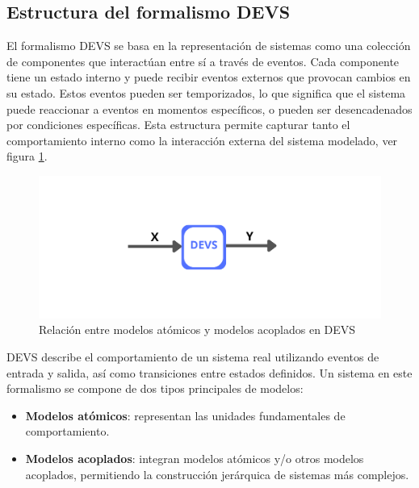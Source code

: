 \documentclass[12pt,oneside]{templates/unerthesis}
\providecommand{\tightlist}{%
  \setlength{\itemsep}{0pt}\setlength{\parskip}{0pt}}
\begin{document}
\hypertarget{estructura-del-formalismo-devs}{%
\subsection{Estructura del formalismo DEVS}\label{estructura-del-formalismo-devs}}

El formalismo DEVS se basa en la representación de sistemas como una colección de componentes que interactúan entre sí a través de eventos. Cada componente tiene un estado interno y puede recibir eventos externos que provocan cambios en su estado. Estos eventos pueden ser temporizados, lo que significa que el sistema puede reaccionar a eventos en momentos específicos, o pueden ser desencadenados por condiciones específicas.
Esta estructura permite capturar tanto el comportamiento interno como la interacción externa del sistema modelado, ver figura \ref{fig:devs}.

\begin{figure}

{\centering \includegraphics[width=1\linewidth]{images/devs} 

}

\caption{Relación entre modelos atómicos y modelos acoplados en DEVS}\label{fig:devs}
\end{figure}

DEVS describe el comportamiento de un sistema real utilizando eventos de entrada y salida, así como transiciones entre estados definidos. Un sistema en este formalismo se compone de dos tipos principales de modelos:

\begin{itemize}
\tightlist
\item
  \textbf{Modelos atómicos}: representan las unidades fundamentales de comportamiento.
\item
  \textbf{Modelos acoplados}: integran modelos atómicos y/o otros modelos acoplados, permitiendo la construcción jerárquica de sistemas más complejos.
\end{itemize}
\end{document}
